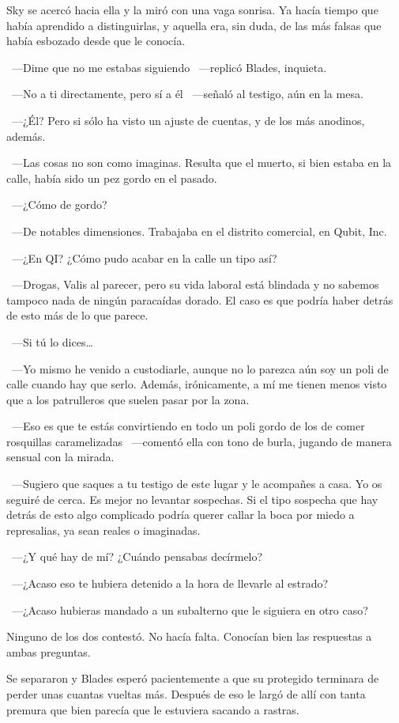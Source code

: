 Sky se acercó hacia ella y la miró con una vaga sonrisa. Ya hacía tiempo que había aprendido a distinguirlas, y aquella era, sin duda, de las más falsas que había esbozado desde que le conocía.

~---Dime que no me estabas siguiendo ~---replicó Blades, inquieta.

~---No a ti directamente, pero sí a él ~---señaló al testigo, aún en la mesa.

~---¿Él? Pero si sólo ha visto un ajuste de cuentas, y de los más anodinos, además.

~---Las cosas no son como imaginas. Resulta que el muerto, si bien estaba en la calle, había sido un pez gordo en el pasado.

~---¿Cómo de gordo?

~---De notables dimensiones. Trabajaba en el distrito comercial, en Qubit, Inc.

~---¿En QI? ¿Cómo pudo acabar en la calle un tipo así?

~---Drogas, Valis al parecer, pero su vida laboral está blindada y no sabemos tampoco nada de ningún paracaídas dorado. El caso es que podría haber detrás de esto más de lo que parece.

~---Si tú lo dices\dots

~---Yo mismo he venido a custodiarle, aunque no lo parezca aún soy un poli de calle cuando hay que serlo. Además, irónicamente, a mí me tienen menos visto que a los patrulleros que suelen pasar por la zona.

~---Eso es que te estás convirtiendo en todo un poli gordo de los de comer rosquillas caramelizadas ~---comentó ella con tono de burla, jugando de manera sensual con la mirada.

~---Sugiero que saques a tu testigo de este lugar y le acompañes a casa. Yo os seguiré de cerca. Es mejor no levantar sospechas. Si el tipo sospecha que hay detrás de esto algo complicado podría querer callar la boca por miedo a represalias, ya sean reales o imaginadas.

~---¿Y qué hay de mí? ¿Cuándo pensabas decírmelo?

~---¿Acaso eso te hubiera detenido a la hora de llevarle al estrado?

~---¿Acaso hubieras mandado a un subalterno que le siguiera en otro caso?

Ninguno de los dos contestó. No hacía falta. Conocían bien las respuestas a ambas preguntas.

Se separaron y Blades esperó pacientemente a que su protegido terminara de perder unas cuantas vueltas más. Después de eso le largó de allí con tanta premura que bien parecía que le estuviera sacando a rastras.

